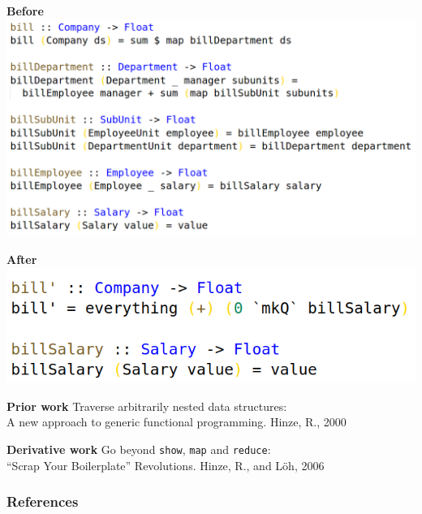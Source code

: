 \documentclass[14pt]{beamer}
\begin{document}
\begin{frame}
  \textbf{Before}
  \vfill
  \includegraphics[height=0.8\textheight,width=\textwidth,keepaspectratio]{graphics/bill-naive-hs.png}
  \vfill
\end{frame}

\begin{frame}
  \textbf{After}
  \vfill
  \includegraphics[height=0.8\textheight,width=\textwidth,keepaspectratio]{graphics/bill-hs.png}
  \vfill
\end{frame}

\begin{frame}
  \textbf{Prior work}
  \vfill
    Traverse arbitrarily nested data structures:\\
    A new approach to generic functional programming. Hinze, R., 2000 \cite{hinze2000new}
  \vfill
\end{frame}

\begin{frame}
  \textbf{Derivative work}
  \vfill
    Go beyond \texttt{show}, \texttt{map} and \texttt{reduce}:\\
    ``Scrap Your Boilerplate'' Revolutions. Hinze, R., and L\"{o}h, 2006 \cite{hinze2006scrap}
  \vfill
\end{frame}

\begin{frame}[fragile]\frametitle{References}
  
\end{frame}
\end{document}
